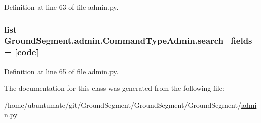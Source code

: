 Definition at line 63 of file admin.\+py.

\hypertarget{class_ground_segment_1_1admin_1_1_command_type_admin_a3a3f190f65a4c32395397c193a0b86e5}{}
\subsubsection[{search\+\_\+fields}]{\setlength{\rightskip}{0pt plus 5cm}list Ground\+Segment.\+admin.\+Command\+Type\+Admin.\+search\+\_\+fields = \mbox{[}\textquotesingle{}code\textquotesingle{}\mbox{]}\hspace{0.3cm}{\ttfamily [static]}}\label{class_ground_segment_1_1admin_1_1_command_type_admin_a3a3f190f65a4c32395397c193a0b86e5}


Definition at line 65 of file admin.\+py.



The documentation for this class was generated from the following file\+:\begin{DoxyCompactItemize}
\item 
/home/ubuntumate/git/\+Ground\+Segment/\+Ground\+Segment/\+Ground\+Segment/\hyperlink{admin_8py}{admin.\+py}\end{DoxyCompactItemize}
